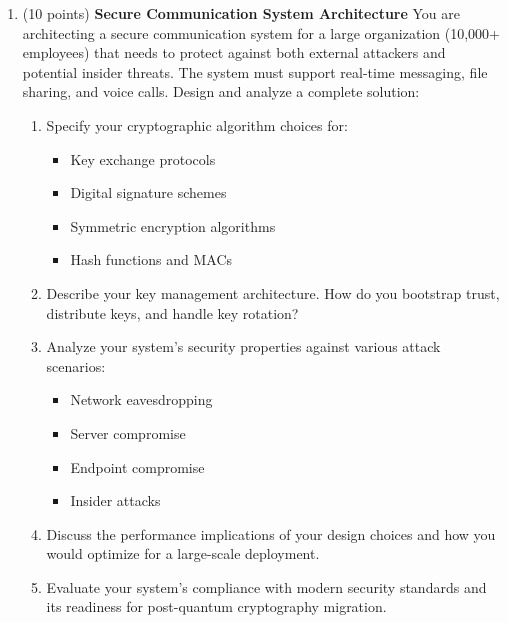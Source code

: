 \documentclass[10pt,a4paper,american]{article}
\begin{document}
\begin{enumerate}
	\item (10 points) \textbf{Secure Communication System Architecture}
	      You are architecting a secure communication system for a large organization (10,000+ employees) that needs to protect against both external attackers and potential insider threats. The system must support real-time messaging, file sharing, and voice calls.
	      Design and analyze a complete solution:
	      \begin{enumerate}
		      \item Specify your cryptographic algorithm choices for:
		            \begin{itemize}
			            \item Key exchange protocols
			            \item Digital signature schemes
			            \item Symmetric encryption algorithms
			            \item Hash functions and MACs
		            \end{itemize}
		      \item Describe your key management architecture. How do you bootstrap trust, distribute keys, and handle key rotation?
		      \item Analyze your system's security properties against various attack scenarios:
		            \begin{itemize}
			            \item Network eavesdropping
			            \item Server compromise
			            \item Endpoint compromise
			            \item Insider attacks
		            \end{itemize}
		      \item Discuss the performance implications of your design choices and how you would optimize for a large-scale deployment.
		      \item Evaluate your system's compliance with modern security standards and its readiness for post-quantum cryptography migration.
	      \end{enumerate}
\end{enumerate}
\end{document}
